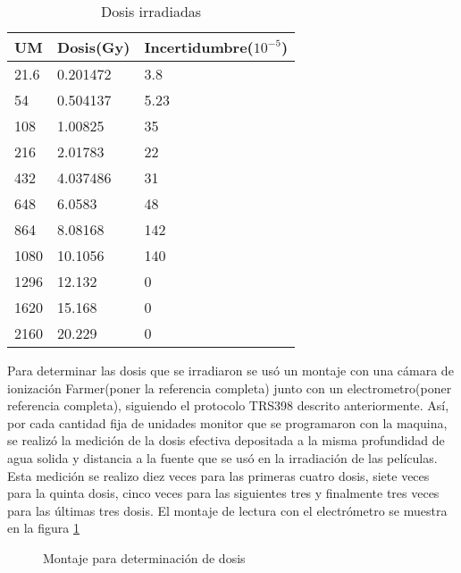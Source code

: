 \begin{table}[]
	\centering
	\begin{tabular}{|l|l|l|}
		\hline
		UM& Dosis(Gy)    & Incertidumbre($10^{-5}$) \\ \hline
		21.6&0.201472 & 3.8           \\ \hline
		54&0.504137 & 5.23          \\ \hline
		108&1.00825  & 35            \\ \hline
		216&2.01783  & 22            \\ \hline
		432&4.037486 & 31            \\ \hline
		648&6.0583   & 48            \\ \hline
		864&8.08168  & 142           \\ \hline
		1080&10.1056  & 140           \\ \hline
		1296&12.132   & 0             \\ \hline
		1620&15.168   & 0             \\ \hline
		2160&20.229   & 0             \\ \hline
	\end{tabular}
\caption{Dosis irradiadas}
\label{tab:DosisIrra}
\end{table}

Para determinar las dosis que se irradiaron se usó un montaje con una cámara de ionización Farmer(poner la referencia completa) junto con un electrometro(poner referencia completa), siguiendo el protocolo TRS398 descrito anteriormente. Así, por cada cantidad fija de unidades monitor que se programaron con la maquina, se realizó la medición de la dosis efectiva depositada a la misma profundidad de agua solida y distancia a la fuente que se usó en la irradiación de las películas. Esta medición se realizo diez veces para las primeras cuatro dosis, siete veces para la quinta dosis, cinco veces para las siguientes tres y finalmente tres veces para las últimas tres dosis. El montaje de lectura con el electrómetro se muestra en la figura \ref{fig:Montajeelectrometro}\\
\begin{figure}
	\centering
	
	\caption{Montaje para determinación de dosis}
	\label{fig:Montajeelectrometro}
\end{figure}

